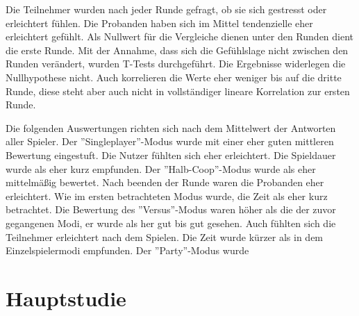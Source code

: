 Die Teilnehmer wurden nach jeder Runde gefragt, ob sie sich gestresst oder erleichtert fühlen. Die Probanden haben sich im Mittel tendenzielle eher erleichtert gefühlt. Als Nullwert für die Vergleiche dienen unter den Runden dient die erste Runde. Mit der Annahme, dass sich die Gefühlslage nicht zwischen den Runden verändert, wurden T-Tests durchgeführt. Die Ergebnisse widerlegen die Nullhypothese nicht. Auch korrelieren die Werte eher weniger bis auf die dritte Runde, diese steht aber auch nicht in vollständiger lineare Korrelation zur ersten Runde.

Die folgenden Auswertungen richten sich nach dem Mittelwert der Antworten aller Spieler.
Der ''Singleplayer''-Modus wurde mit einer eher guten mittleren Bewertung eingestuft. Die Nutzer fühlten sich eher erleichtert. Die Spieldauer wurde als eher kurz empfunden.
Der ''Halb-Coop''-Modus  wurde als eher mittelmäßig bewertet. Nach beenden der Runde waren die Probanden eher erleichtert. Wie im ersten betrachteten Modus wurde, die Zeit als eher kurz betrachtet.
Die Bewertung des ''Versus''-Modus waren höher als die der zuvor gegangenen Modi, er wurde als her gut bis gut gesehen.  Auch fühlten sich die Teilnehmer erleichtert nach dem Spielen. Die Zeit wurde kürzer als in dem Einzelspielermodi empfunden.
Der ''Party''-Modus wurde 


\chapter{Hauptstudie}
